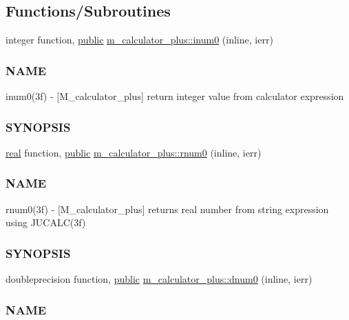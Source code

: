 \subsection*{Functions/\+Subroutines}
\begin{DoxyCompactItemize}
\item 
integer function, \hyperlink{M__stopwatch_83_8txt_a2f74811300c361e53b430611a7d1769f}{public} \hyperlink{namespacem__calculator__plus_a3edbf94f311a3fad4a83fd8dfe26a61a}{m\+\_\+calculator\+\_\+plus\+::inum0} (inline, ierr)
\begin{DoxyCompactList}\small\item\em \subsubsection*{N\+A\+ME}

inum0(3f) -\/ \mbox{[}M\+\_\+calculator\+\_\+plus\mbox{]} return integer value from calculator expression \subsubsection*{S\+Y\+N\+O\+P\+S\+IS}\end{DoxyCompactList}\item 
\hyperlink{read__watch_83_8txt_abdb62bde002f38ef75f810d3a905a823}{real} function, \hyperlink{M__stopwatch_83_8txt_a2f74811300c361e53b430611a7d1769f}{public} \hyperlink{namespacem__calculator__plus_a448c42e7171e27c1f4a8e339687b0e3f}{m\+\_\+calculator\+\_\+plus\+::rnum0} (inline, ierr)
\begin{DoxyCompactList}\small\item\em \subsubsection*{N\+A\+ME}

rnum0(3f) -\/ \mbox{[}M\+\_\+calculator\+\_\+plus\mbox{]} returns real number from string expression using J\+U\+C\+A\+L\+C(3f) \subsubsection*{S\+Y\+N\+O\+P\+S\+IS}\end{DoxyCompactList}\item 
doubleprecision function, \hyperlink{M__stopwatch_83_8txt_a2f74811300c361e53b430611a7d1769f}{public} \hyperlink{namespacem__calculator__plus_add45c0bb36bc796ee8a0354665f9397e}{m\+\_\+calculator\+\_\+plus\+::dnum0} (inline, ierr)
\begin{DoxyCompactList}\small\item\em \subsubsection*{N\+A\+ME}


\end{DoxyCompactList}
\end{DoxyCompactItemize}
